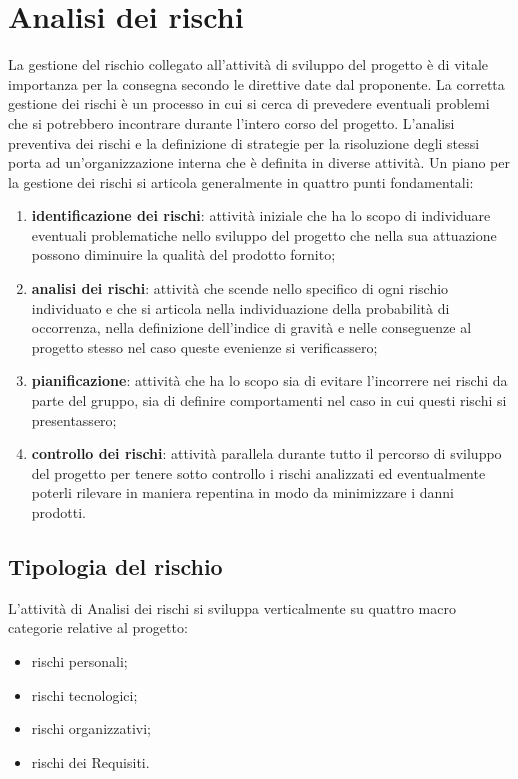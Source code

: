 \section{Analisi dei rischi} \label{_analisiDeiRischi}
	La gestione del rischio collegato all'attività di sviluppo del progetto è di vitale importanza per la consegna secondo le direttive date dal proponente. La corretta gestione dei rischi è un processo in cui si cerca di prevedere eventuali problemi che si potrebbero incontrare durante l'intero corso del progetto. L'analisi preventiva dei rischi e la definizione di strategie per la risoluzione degli stessi porta ad un'organizzazione interna che è definita in diverse attività.
	Un piano per la gestione dei rischi si articola generalmente in quattro punti fondamentali: 
\begin{enumerate}
	\item \textbf{identificazione dei rischi}: attività iniziale che ha lo scopo di individuare eventuali problematiche nello sviluppo del progetto che nella sua attuazione possono diminuire la qualità del prodotto fornito;
	\item \textbf{analisi dei rischi}: attività che scende nello specifico di ogni rischio individuato e che si articola nella individuazione della probabilità di occorrenza, nella definizione dell'indice di gravità e nelle conseguenze al progetto stesso nel caso queste evenienze si verificassero;
	\item \textbf{pianificazione}: attività che ha lo scopo sia di evitare l'incorrere nei rischi da parte del gruppo, sia di definire comportamenti nel caso in cui questi rischi si presentassero;
	\item \textbf{controllo dei rischi}: attività parallela durante tutto il percorso di sviluppo del progetto per tenere sotto controllo i rischi analizzati ed eventualmente poterli rilevare in maniera repentina in modo da minimizzare i danni prodotti.
\end{enumerate}

\subsection{Tipologia del rischio}
L'attività di Analisi dei rischi si sviluppa verticalmente su quattro macro categorie relative al progetto:
\begin{itemize}
	\item rischi personali;
	\item rischi tecnologici;
	\item rischi organizzativi;
	\item rischi dei Requisiti.
\end{itemize}

